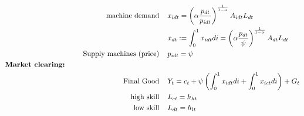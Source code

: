 \begin{align*}
\text{machine demand}\hspace{4mm} & x_{idt} = \left(\alpha\frac{ p_{dt}}{p_{idt}}\right)^\frac{1}{1-\alpha}A_{idt}L_{dt}\\
& x_{dt}:=\int_{0}^{1}x_{idt} di= \left(\alpha\frac{p_{dt}}{\psi}\right)^\frac{1}{1-\alpha}A_{dt}L_{dt}\\
\text{Supply machines (price)}\hspace{4mm}& p_{idt}=\psi\\
\text{\textbf{Market clearing:}}\hspace{50mm}& \nonumber\\
\text{Final Good}\hspace{4mm}& Y_{t}=c_t+\psi\left(\int_{0}^1x_{idt}di+\int_{0}^1x_{ict}di\right)+G_t%
\\
\text{high skill}\hspace{4mm}& L_{ct}=h_{ht}\\
\text{low skill}\hspace{4mm}&L_{dt}=h_{lt}
\end{align*}

